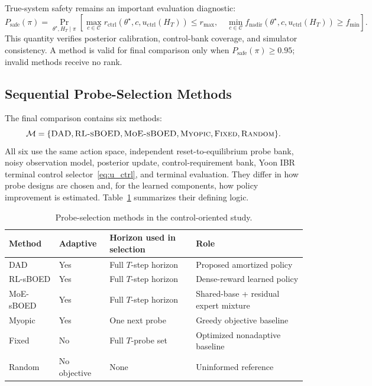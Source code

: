 \documentclass[11pt]{article}
\begin{document}
True-system safety remains an important evaluation diagnostic:
\[
P_{\mathrm{safe}}(\pi)
=
\Pr_{\theta^\star,H_T\mid\pi}
\left[
\max_{c\in\mathcal C}
 r_{\mathrm{ctrl}}\!\left(\theta^\star,c,u_{\mathrm{ctrl}}(H_T)\right)\le r_{\max},
\quad
\min_{c\in\mathcal C}
 f_{\mathrm{nadir}}\!\left(\theta^\star,c,u_{\mathrm{ctrl}}(H_T)\right)\ge f_{\min}
\right].
\]
This quantity verifies posterior calibration, control-bank coverage, and
simulator consistency. A method is valid for final comparison only when
\(P_{\mathrm{safe}}(\pi)\ge0.95\); invalid methods receive no rank.

\subsection{Sequential Probe-Selection Methods}

The final comparison contains six methods:
\[
\mathcal M
=
\{
\textsc{DAD},
\textsc{RL-sBOED},
\textsc{MoE-sBOED},
\textsc{Myopic},
\textsc{Fixed},
\textsc{Random}
\}.
\]
All six use the same action space, independent reset-to-equilibrium probe bank,
noisy observation model, posterior update, control-requirement bank, Yoon IBR
terminal control selector~\eqref{eq:u_ctrl}, and terminal evaluation. They differ
in how probe designs are chosen and, for the learned components, how policy
improvement is estimated. Table~\ref{tab:methods} summarizes their defining logic.

\begin{table}[ht]
\centering
\caption{Probe-selection methods in the control-oriented study.}
\label{tab:methods}
\begin{tabular}{llll}
\toprule
Method & Adaptive & Horizon used in selection & Role \\
\midrule
DAD & Yes & Full \(T\)-step horizon & Proposed amortized policy \\
RL-sBOED & Yes & Full \(T\)-step horizon & Dense-reward learned policy \\
MoE-sBOED & Yes & Full \(T\)-step horizon & Shared-base + residual expert mixture \\
Myopic & Yes & One next probe & Greedy objective baseline \\
Fixed & No & Full \(T\)-probe set & Optimized nonadaptive baseline \\
Random & No objective & None & Uninformed reference \\
\bottomrule
\end{tabular}
\end{table}
\end{document}
